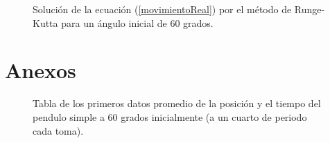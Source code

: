 \documentclass[aps,twocolumn,secnumarabic,nobalancelastpage,amsmath,amssymb,nofootinbib]{revtex4-1}
\begin{document}
		
		\begin{figure}[!htb]
			\caption{Soluci\'on de la ecuaci\'on (\ref{movimientoReal}) por el m\'etodo de Runge-Kutta para un \'angulo inicial de 60 grados.}
			\label{fig:RK60}
		\end{figure}   
		 
		 
	
	
	\section{Anexos}
	
		\begin{figure}[!htb]
			\caption{Tabla de los primeros datos promedio de la posici\'on y el tiempo del pendulo simple a 60 grados inicialmente (a un cuarto de periodo cada toma).}
			\label{fig:penduloSimple60}
		\end{figure} 
		
\end{document}
